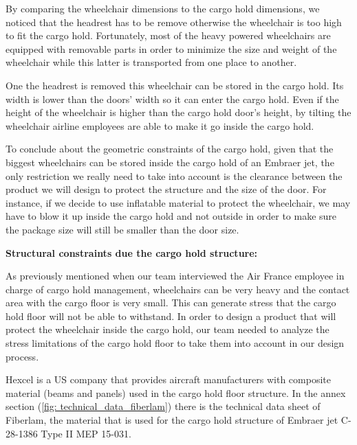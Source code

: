 By comparing the wheelchair dimensions to the cargo hold dimensions, we noticed that the headrest has to be remove otherwise the wheelchair is too high to fit the cargo hold. Fortunately, most of the heavy powered wheelchairs are equipped with removable parts in order to minimize the size and weight of the wheelchair while this latter is transported from one place to another.

One the headrest is removed this wheelchair can be stored in the cargo hold. Its width is lower than the doors’ width so it can enter the cargo hold. Even if the height of the wheelchair is higher than the cargo hold door’s height, by tilting the wheelchair airline employees are able to make it go inside the cargo hold.

To conclude about the geometric constraints of the cargo hold, given that the biggest wheelchairs can be stored inside the cargo hold of an Embraer jet, the only restriction we really need to take into account is the clearance between the product we will design to protect the structure and the size of the door. For instance, if we decide to use inflatable material to protect the wheelchair, we may have to blow it up inside the cargo hold and not outside in order to make sure the package size will still be smaller than the door size.

\textbf{Structural constraints due the cargo hold structure:}

As previously mentioned when our team interviewed the Air France employee in charge of cargo hold management, wheelchairs can be very heavy and the contact area with the cargo floor is very small. This can generate stress that the cargo hold floor will not be able to withstand. In order to design a product that will protect the wheelchair inside the cargo hold, our team needed to analyze the stress limitations of the cargo hold floor to take them into account in our design process.

Hexcel is a US company that provides aircraft manufacturers with composite material (beams and panels) used in the cargo hold floor structure. In the annex section (\ref{fig: technical_data_fiberlam}) there is the technical data sheet of Fiberlam, the material that is used for the cargo hold structure of Embraer jet C-28-1386 Type II MEP 15-031.

